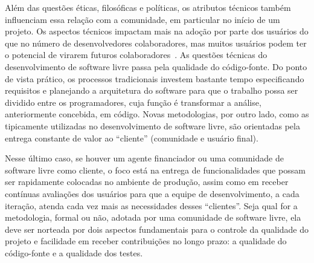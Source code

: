 Além das questões éticas, filosóficas e políticas, os atributos técnicos
também influenciam essa relação com a comunidade, em particular no início
de um projeto. Os aspectos técnicos impactam mais na adoção por parte dos
usuários do que no número de desenvolvedores colaboradores, mas muitos
usuários podem ter o potencial de virarem futuros colaboradores~\cite{meirelles:2010}.
%
As questões técnicas do desenvolvimento de software livre passa pela qualidade
do código-fonte.
%
Do ponto de vista prático, os processos tradicionais investem
bastante tempo especificando requisitos e planejando a arquitetura do software para
que o trabalho possa ser dividido entre os programadores, cuja função é
transformar a análise, anteriormente concebida, em código.
%
Novas metodologias, por outro lado, como as tipicamente utilizadas no
desenvolvimento de software livre, são orientadas pela entrega constante de
valor ao ``cliente'' (comunidade e usuário final).

Nesse último caso, se houver um agente financiador ou uma comunidade de software livre como
cliente, o foco está na entrega de funcionalidades que possam ser rapidamente
colocadas no ambiente de produção, assim como em receber contínuas avaliações dos usuários para
que a equipe de desenvolvimento, a cada iteração, atenda cada vez mais as
necessidades desses ``clientes''.
%
Seja qual for a metodologia, formal ou não, adotada por uma comunidade de software
livre, ela deve ser norteada por dois aspectos fundamentais para
o controle da qualidade do projeto e facilidade em receber contribuições
no longo prazo: a qualidade do código-fonte e a qualidade dos testes.


